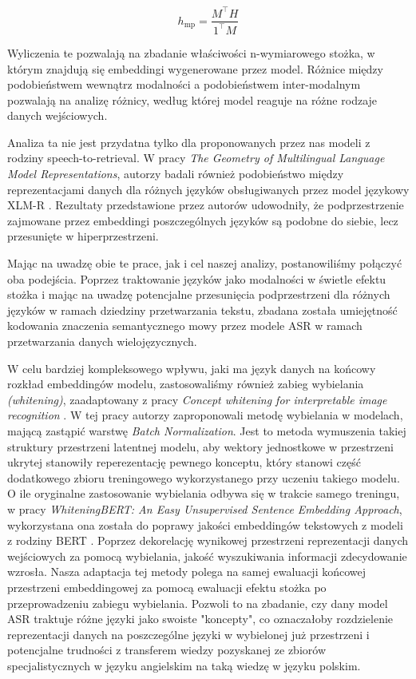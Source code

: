 \begin{equation}
    h_{\text{mp}} =
    \frac{M^\top H}{1^\top M}
\end{equation}


Wyliczenia te pozwalają na zbadanie właściwości n-wymiarowego stożka, w którym znajdują się embeddingi wygenerowane przez model. Różnice między podobieństwem wewnątrz modalności a podobieństwem inter-modalnym pozwalają na analizę różnicy, według której model reaguje na różne rodzaje danych wejściowych.

Analiza ta nie jest przydatna tylko dla proponowanych przez nas modeli z rodziny speech-to-retrieval. W pracy \textit{The Geometry of Multilingual Language Model Representations}, autorzy badali również podobieństwo między reprezentacjami danych dla różnych języków obsługiwanych przez model językowy XLM-R \cite{chang2022geometry}. Rezultaty przedstawione przez autorów udowodniły, że podprzestrzenie zajmowane przez embeddingi poszczególnych języków są podobne do siebie, lecz przesunięte w hiperprzestrzeni.

Mając na uwadzę obie te prace, jak i cel naszej analizy, postanowiliśmy połączyć oba podejścia. Poprzez traktowanie języków jako modalności w świetle efektu stożka i mając na uwadzę potencjalne przesunięcia podprzestrzeni dla różnych języków w ramach dziedziny przetwarzania tekstu, zbadana została umiejętność kodowania znaczenia semantycznego mowy przez modele ASR w ramach przetwarzania danych wielojęzycznych.

W celu bardziej kompleksowego wpływu, jaki ma język danych na końcowy rozkład embeddingów modelu, zastosowaliśmy również zabieg wybielania \textit{(whitening)}, zaadaptowany z pracy \textit{Concept whitening for interpretable image recognition} \cite{whitening}. W tej pracy autorzy zaproponowali metodę wybielania w modelach, mającą zastąpić warstwę \textit{Batch Normalization}. Jest to metoda wymuszenia takiej struktury przestrzeni latentnej modelu, aby wektory jednostkowe w przestrzeni ukrytej stanowiły reperezentację pewnego konceptu, który stanowi część dodatkowego zbioru treningowego wykorzystanego przy uczeniu takiego modelu. O ile oryginalne zastosowanie wybielania odbywa się w trakcie samego treningu, w pracy \textit{WhiteningBERT: An Easy Unsupervised Sentence Embedding Approach}, wykorzystana ona została do poprawy jakości embeddingów tekstowych z modeli z rodziny BERT \cite{whiteningbert}. Poprzez dekorelację wynikowej przestrzeni reprezentacji danych wejściowych za pomocą wybielania, jakość wyszukiwania informacji zdecydowanie wzrosła. Nasza adaptacja tej metody polega na samej ewaluacji końcowej przestrzeni embeddingowej za pomocą ewaluacji efektu stożka po przeprowadzeniu zabiegu wybielania. Pozwoli to na zbadanie, czy dany model ASR traktuje różne języki jako swoiste "koncepty", co oznaczałoby rozdzielenie reprezentacji danych na poszczególne języki w wybielonej już przestrzeni i potencjalne trudności z transferem wiedzy pozyskanej ze zbiorów specjalistycznych w języku angielskim na taką wiedzę w języku polskim.

